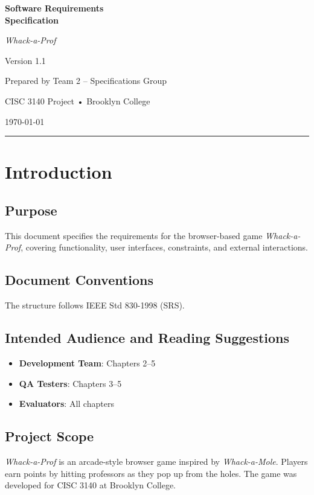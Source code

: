 \documentclass[11pt]{scrreprt}
\date{\today}
\newcommand*{\product}{\textit{Whack-a-Prof}\xspace}
\def\version{1.1}
\begin{document}
\begin{titlepage}
  \centering
  {\Huge\bfseries Software Requirements\\[4pt] Specification\par}
  \vspace{1.5cm}
  {\LARGE \product\par}
  \vfill
  {\Large Version \version\par}
  \vspace{1cm}
  {\large Prepared by Team 2 – Specifications Group\par}
  {\large CISC 3140 Project • Brooklyn College\par}
  {\large \today}
  \vfill
  \rule{\linewidth}{0.5mm}
\end{titlepage}

\tableofcontents
\clearpage

\chapter{Introduction}

\section{Purpose}
This document specifies the requirements for the browser-based game \product, covering functionality, user interfaces, constraints, and external interactions.

\section{Document Conventions}
The structure follows IEEE Std 830-1998 (SRS).

\section{Intended Audience and Reading Suggestions}
\begin{itemize}
  \item \textbf{Development Team}: Chapters 2–5
  \item \textbf{QA Testers}: Chapters 3–5
  \item \textbf{Evaluators}: All chapters
\end{itemize}

\section{Project Scope}
\product is an arcade-style browser game inspired by \emph{Whack-a-Mole}. Players earn points by hitting professors as they pop up from the holes. The game was developed for CISC 3140 at Brooklyn College.
\end{document}
